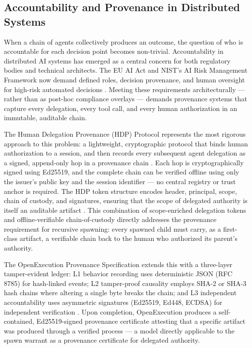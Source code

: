 \subsection{Accountability and Provenance in Distributed Systems}

When a chain of agents collectively produces an outcome, the question of who is accountable for each decision point becomes non-trivial. Accountability in distributed AI systems has emerged as a central concern for both regulatory bodies and technical architects. The EU AI Act and NIST's AI Risk Management Framework now demand defined roles, decision provenance, and human oversight for high-risk automated decisions \cite{dzone2025accountability}. Meeting these requirements architecturally --- rather than as post-hoc compliance overlays --- demands provenance systems that capture every delegation, every tool call, and every human authorization in an immutable, auditable chain.

The Human Delegation Provenance (HDP) Protocol represents the most rigorous approach to this problem: a lightweight, cryptographic protocol that binds human authorization to a session, and then records every subsequent agent delegation as a signed, append-only hop in a provenance chain \cite{hdp2026, hdp2025ietf}. Each hop is cryptographically signed using Ed25519, and the complete chain can be verified offline using only the issuer's public key and the session identifier --- no central registry or trust anchor is required. The HDP token structure encodes header, principal, scope, chain of custody, and signatures, ensuring that the scope of delegated authority is itself an auditable artifact \cite{hdp2026}. This combination of scope-enriched delegation tokens and offline-verifiable chain-of-custody directly addresses the provenance requirement for recursive spawning: every spawned child must carry, as a first-class artifact, a verifiable chain back to the human who authorized its parent's authority.

The OpenExecution Provenance Specification extends this with a three-layer tamper-evident ledger: L1 behavior recording uses deterministic JSON (RFC 8785) for hash-linked events; L2 tamper-proof causality employs SHA-2 or SHA-3 hash chains where altering a single byte breaks the chain; and L3 independent accountability uses asymmetric signatures (Ed25519, Ed448, ECDSA) for independent verification \cite{openexecution2025}. Upon completion, OpenExecution produces a self-contained, Ed25519-signed provenance certificate attesting that a specific artifact was produced through a verified process --- a model directly applicable to the spawn warrant as a provenance certificate for delegated authority.


